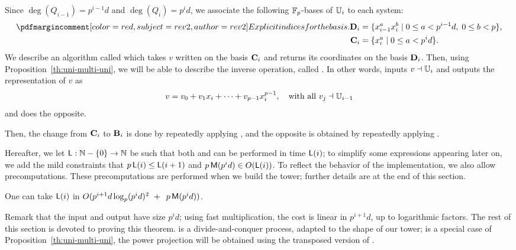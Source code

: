 Since $\deg(Q_{i-1})=p^{i-1}d$ and $\deg(Q_{i})=p^id$, we associate
the following $\mathbb{F}_p$-bases of $\mathbb{U}_i$ to each system:
\begin{align}
  \pdfmctwo{Explicit indices for the basis.}
  \basis{D}_i &= \{x_{i-1}^ax_i^b \;|\; 0\le a<p^{i-1}d,\; 0\le b<p\}
  \text{,}\\
  \label{eq:bases}
 \basis{C}_i&=\{x_i^a \;|\; 0\le a<p^id\}
 \text{.}  
\end{align}
We describe an algorithm called \hyperref[alg:push-down]{} which takes $v$
written on the basis $\mathbf{C}_i$ and returns its coordinates on the
basis $\mathbf{D}_i$. Then, using Proposition~\ref{th:uni-multi-uni},
we will be able to describe the inverse operation, called
\hyperref[alg:liftup]{}.  In other words, \hyperref[alg:push-down]{} inputs $v\dashv\mathbb{U}_i$ and
outputs the representation of $v$ as
\begin{equation}
  \label{eq:vectorspace}
  v = v_0 + v_1x_i + \cdots + v_{p-1}x_i^{p-1}, \quad\text{with all~} v_j \dashv \mathbb{U}_{i-1}
\end{equation}
and \hyperref[alg:liftup]{} does the opposite.

Then, the change from $\mathbf{C}_i$ to $\mathbf{B}_i$ is done by
repeatedly applying \hyperref[alg:push-down]{}, and the opposite is obtained by
repeatedly applying \hyperref[alg:liftup]{}.

Hereafter, we let $\mathsf{L}:\mathbb{N}-\{0\} \to \mathbb{N}$ be such that both
\hyperref[alg:push-down]{} and
\hyperref[alg:liftup]{} can be performed in time
$\mathsf{L}(i)$; to simplify some expressions appearing later on, we add
the mild constraints that $p\,\mathsf{L}(i) \le \mathsf{L}(i+1)$ and
$p\,\mathsf{M}(p^{i}d) \in O(\mathsf{L}(i))$.  To reflect the behavior of the
implementation, we also allow precomputations. These precomputations
are performed when we build the tower; further details are at the end
of this section.
\begin{theorem}\label{theo:L}
  One can take $\mathsf{L}(i)$ in $O( p^{i+1}d\log_p(p^id)^2 \ + \
\,p\,\mathsf{M}(p^{i}d))$.
\end{theorem}
Remark that the input and output have size $p^id$; using fast
multiplication, the cost is linear in $p^{i+1}d$, up to logarithmic
factors. The rest of this section is devoted to proving this theorem.
\hyperref[alg:push-down]{\alg{Push-down}} is a divide-and-conquer process, adapted to the shape
of our tower; \hyperref[alg:liftup]{\alg{Lift-up}} is a special case of
Proposition~\ref{th:uni-multi-uni}, the power projection will be
obtained using the transposed version of \hyperref[alg:push-down]{}.

